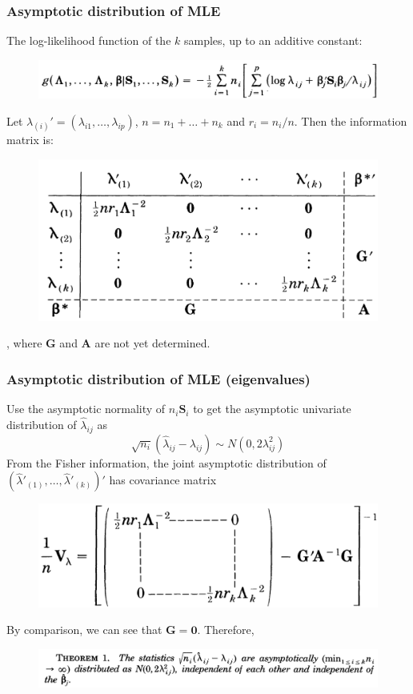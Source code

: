 \documentclass{beamer}
\begin{document}
	\begin{frame}
		\frametitle{Asymptotic distribution of MLE}
		The log-likelihood function of the $k$ samples, up to an additive constant:
		\begin{figure}
			\includegraphics[width=0.8\linewidth]{image001.png}
		\end{figure}
		Let $\lambda_{(i)}' = (\lambda_{i1},\ldots,\lambda_{ip})$, $n = n_1+\ldots+n_k$ and $r_i = n_i/n$. Then the information matrix is:
		\begin{figure}
			\includegraphics[width=0.6\linewidth]{image002.png}
		\end{figure}	
		, where $\bm{G}$ and $\bm{A}$ are not yet determined.
	\end{frame}
	
	\begin{frame}
		\frametitle{Asymptotic distribution of MLE (eigenvalues)}
		Use the asymptotic normality of $n_i\bm{S}_i$ to get the asymptotic univariate distribution of $\hat{\lambda}_{ij}$ as
		$$\sqrt{n_i}(\hat{\lambda}_{ij} - \lambda_{ij}) \sim N(0, 2\lambda_{ij}^2)$$
		From the Fisher information, the joint asymptotic distribution of $(\hat{\lambda}'_{(1)},\ldots,\hat{\lambda}'_{(k)})'$ has covariance matrix
		\begin{figure}
			\includegraphics[width=0.6\linewidth]{image003.png}
		\end{figure}
		By comparison, we can see that $\bm{G} = \bm{0}$. Therefore,
		\begin{figure}
			\includegraphics[width=0.9\linewidth]{image004.png}
		\end{figure} 
	\end{frame}
	
\end{document}
